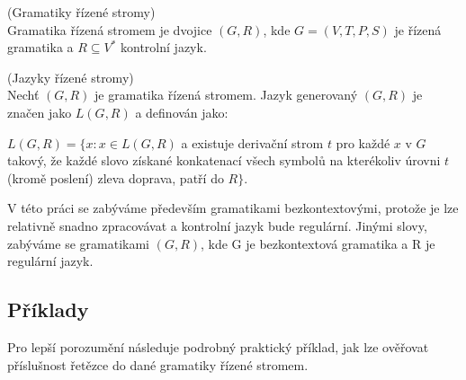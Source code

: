 \begin{defn}
  (Gramatiky řízené stromy) \cite[str. 28]{Koutny}\\
  Gramatika řízená stromem je dvojice $(G, R)$, kde $G = (V, T, P, S)$
  je řízená gramatika a $R \subseteq V^*$ kontrolní jazyk.
\end{defn}

\begin{defn}
  (Jazyky řízené stromy) \cite[str. 28]{Koutny} \label{jazykyRS}\\
  Nechť $(G, R)$ je gramatika řízená stromem.
  Jazyk generovaný $(G, R)$ je značen jako $L(G, R)$ a definován jako:
  \begin{adjustwidth}{0.5cm}{0.5cm}
    $L(G, R) = \{x: x \in L(G, R)$ a existuje derivační strom $t$ pro
    každé $x$ v $G$ takový, že každé slovo získané konkatenací
    všech symbolů na kterékoliv úrovni $t$ (kromě poslení) zleva doprava,
    patří do $R \}$.\\
  \end{adjustwidth}
\end{defn}

\noindent
V této práci se zabýváme především gramatikami bezkontextovými, protože
je lze relativně snadno zpracovávat a kontrolní jazyk bude regulární.
Jinými slovy, zabýváme se gramatikami $(G, R)$, kde G je bezkontextová gramatika
a R je regulární jazyk.

\subsection{Příklady}

Pro lepší porozumění následuje podrobný praktický příklad, jak lze
ověřovat příslušnost řetězce do dané gramatiky řízené stromem.

